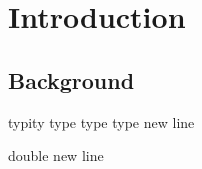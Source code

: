 
\chapter{Introduction}\label{ch:Intro}


   \section{Background} \label{sec:background}

typity type type type
new line

double new line 
